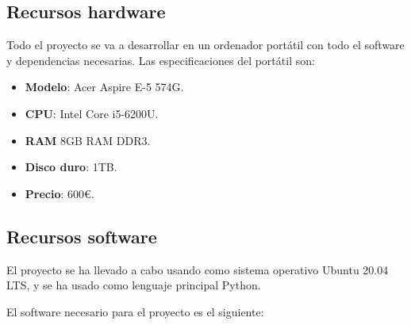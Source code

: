\subsection{Recursos hardware}

Todo el proyecto se va a desarrollar en un ordenador portátil con todo el software y dependencias necesarias. Las especificaciones del portátil son:

\begin{itemize}
\item \textbf{Modelo}: Acer Aspire E-5 574G.
\item \textbf{CPU}: Intel Core i5-6200U.
\item \textbf{RAM} 8GB RAM DDR3.
\item \textbf{Disco duro}: 1TB.
\item \textbf{Precio}: 600€.
\end{itemize}

\subsection{Recursos software}

El proyecto se ha llevado a cabo usando como sistema operativo Ubuntu 20.04 LTS, y se ha usado como lenguaje principal Python.

El software necesario para el proyecto es el siguiente:

